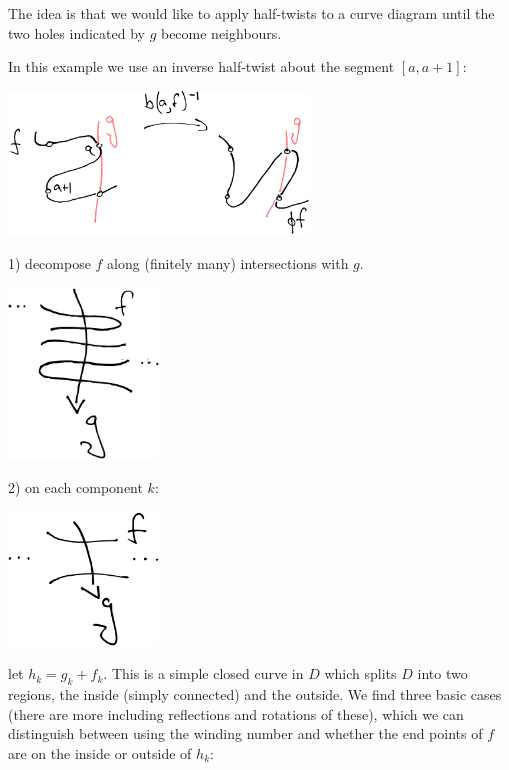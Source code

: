 \documentclass[12pt,a4paper]{article}
\begin{document}
The idea is that we would like to apply half-twists to a curve diagram
until the two holes indicated by $g$ become neighbours.


In this example we use an inverse half-twist about the segment $[a, a+1]:$

\begin{center}
\includegraphics[width=0.6\textwidth]{example-problem-1.eps}
\end{center}



1) decompose $f$ along (finitely many) intersections
with $g.$

\begin{center}
\includegraphics[width=0.3\textwidth]{snake-decompose.eps}
\end{center}


2) on each component $k$:

\begin{center}
\includegraphics[width=0.3\textwidth]{snake-component.eps}
\end{center}

let $h_k = g_k + f_k.$
This is a simple closed curve in $D$ which splits $D$
into two regions, the inside (simply connected) and the
outside.
We find three basic cases (there are more including reflections
and rotations of these), which we can distinguish between
using the winding number and whether the end points
of $f$ are on the inside or outside of $h_k$:
\end{document}
